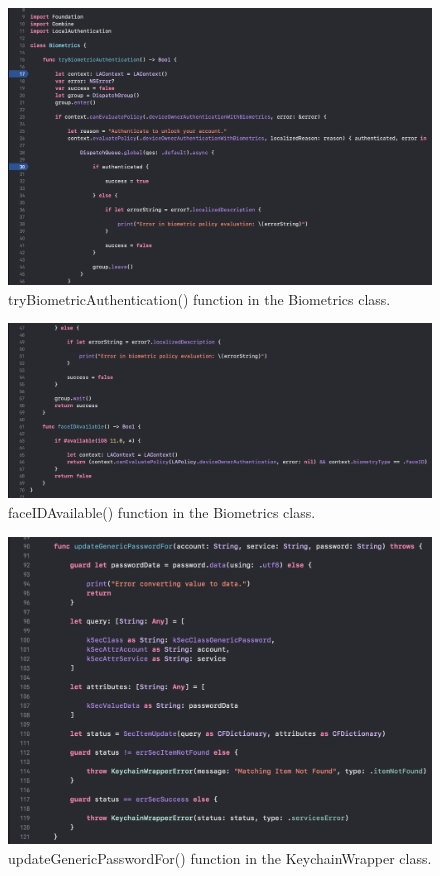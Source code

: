 \begin{figure}[H]
    \centering
    \includegraphics[width=\textwidth]{./graphics/Implementation/Settings/biometrics1.png}
    \caption{tryBiometricAuthentication() function in the Biometrics class.}
    \label{fig:biometrics1}
\end{figure}

\begin{figure}[H]
    \centering
    \includegraphics[width=\textwidth]{./graphics/Implementation/Settings/biometrics2.png}
    \caption{faceIDAvailable() function in the Biometrics class.}
    \label{fig:biometrics2}
\end{figure}

\begin{figure}[H]
    \centering
    \includegraphics[width=\textwidth]{./graphics/Implementation/Settings/keychain3.png}
    \caption{updateGenericPasswordFor() function in the KeychainWrapper class.}
    \label{fig:keychain3}
\end{figure}

